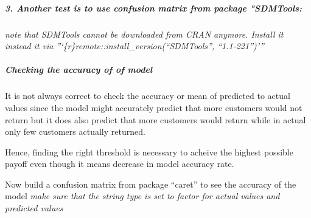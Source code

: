 \documentclass[
]{article}
\newenvironment{Shaded}{\begin{snugshade}}{\end{snugshade}}
\newcommand{\CommentTok}[1]{\textcolor[rgb]{0.56,0.35,0.01}{\textit{#1}}}
\newcommand{\DataTypeTok}[1]{\textcolor[rgb]{0.13,0.29,0.53}{#1}}
\newcommand{\DecValTok}[1]{\textcolor[rgb]{0.00,0.00,0.81}{#1}}
\newcommand{\FloatTok}[1]{\textcolor[rgb]{0.00,0.00,0.81}{#1}}
\newcommand{\KeywordTok}[1]{\textcolor[rgb]{0.13,0.29,0.53}{\textbf{#1}}}
\newcommand{\NormalTok}[1]{#1}
\newcommand{\OperatorTok}[1]{\textcolor[rgb]{0.81,0.36,0.00}{\textbf{#1}}}
\newcommand{\StringTok}[1]{\textcolor[rgb]{0.31,0.60,0.02}{#1}}
\begin{document}
\hypertarget{another-test-is-to-use-confusion-matrix-from-package-sdmtools}{%
\subparagraph{3. Another test is to use confusion matrix from package
"SDMTools:}\label{another-test-is-to-use-confusion-matrix-from-package-sdmtools}}

\emph{note that SDMTools cannot be downloaded from CRAN anymore. Install
it instead it via ''`\{r\}remote::install\_version(``SDMTools'',
``1.1-221'')'''}

\hypertarget{checking-the-accuracy-of-of-model}{%
\subparagraph{Checking the accuracy of of
model}\label{checking-the-accuracy-of-of-model}}

It is not always correct to check the accuracy or mean of predicted to
actual values since the model might accurately predict that more
customers would not return but it does also predict that more customers
would return while in actual only few customers actually returned.

Hence, finding the right threshold is necessary to acheive the highest
possible payoff even though it means decrease in model accuracy rate.

\begin{Shaded}
\end{Shaded}

Now build a confusion matrix from package ``caret'' to see the accuracy
of the model \emph{make sure that the string type is set to factor for
actual values and predicted values}

\begin{Shaded}
\end{Shaded}
\end{document}

